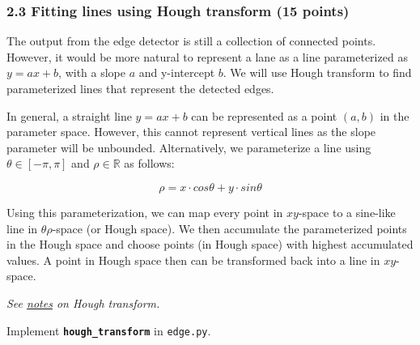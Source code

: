 \documentclass[11pt]{article}
\begin{document}
    \subsubsection{2.3 Fitting lines using Hough transform (15
points)}\label{fitting-lines-using-hough-transform-15-points}

The output from the edge detector is still a collection of connected
points. However, it would be more natural to represent a lane as a line
parameterized as \(y = ax + b\), with a slope \(a\) and y-intercept
\(b\). We will use Hough transform to find parameterized lines that
represent the detected edges.

In general, a straight line \(y = ax + b\) can be represented as a point
\((a, b)\) in the parameter space. However, this cannot represent
vertical lines as the slope parameter will be unbounded. Alternatively,
we parameterize a line using \(\theta\in{[-\pi, \pi]}\) and
\(\rho\in{\mathbb{R}}\) as follows:

\[
\rho = x\cdot{cos\theta} + y\cdot{sin\theta}
\]

Using this parameterization, we can map every point in \(xy\)-space to a
sine-like line in \(\theta\rho\)-space (or Hough space). We then
accumulate the parameterized points in the Hough space and choose points
(in Hough space) with highest accumulated values. A point in Hough space
then can be transformed back into a line in \(xy\)-space.

\emph{See
\href{http://web.ipac.caltech.edu/staff/fmasci/home/astro_refs/HoughTrans_lines_09.pdf}{notes}
on Hough transform.}

Implement \textbf{\texttt{hough\_transform}} in \texttt{edge.py}.
\end{document}
